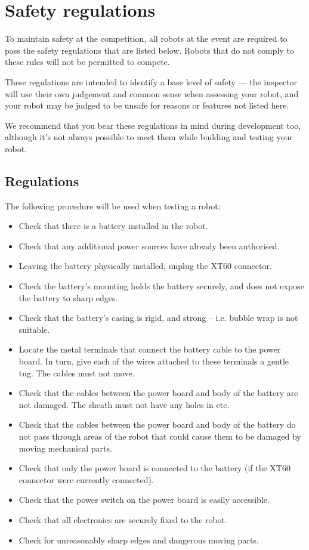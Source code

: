 \section {Safety regulations}
\label{sec:safety-regs}

To maintain safety at the competition, all robots at the event are required to
pass the safety regulations that are listed below. Robots that do not comply
to these rules will not be permitted to compete.

These regulations are intended to identify a base level of safety --- the
inspector will use their own judgement and common sense when assessing
your robot, and your robot may be judged to be unsafe for reasons or features
not listed here.

We recommend that you bear these regulations in mind during development too,
although it's not always possible to meet them while building and testing
your robot.

\subsection{Regulations}

The following procedure will be used when testing a robot:

\begin{itemize}
\item Check that there is a battery installed in the robot.
\item Check that any additional power sources have already been authorised.
\item Leaving the battery physically installed, unplug the XT60 connector.
\item Check the battery's mounting holds the battery securely, and does not expose the battery to sharp edges.
\item Check that the battery's casing is rigid, and strong -- i.e. bubble wrap is not suitable.
\item Locate the metal terminals that connect the battery cable to the power board. In turn, give each of the wires attached to these terminals a gentle tug. The cables must not move.
\item Check that the cables between the power board and body of the battery are not damaged. The sheath must not have any holes in etc.
\item Check that the cables between the power board and body of the battery do not pass through areas of the robot that could cause them to be damaged by moving mechanical parts.
\item Check that only the power board is connected to the battery (if the XT60 connector were currently connected).
\item Check that the power switch on the power board is easily accessible.
\item Check that all electronics are securely fixed to the robot.
\item Check for unreasonably sharp edges and dangerous moving parts.
\end{itemize}
